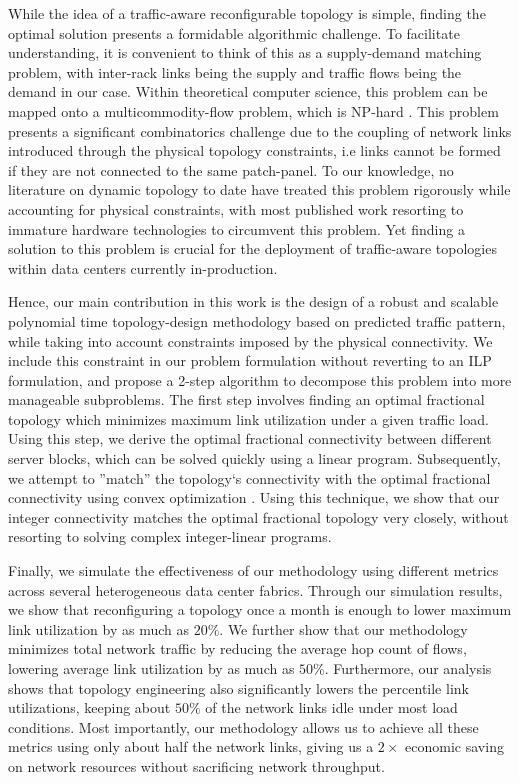 \documentclass[sigconf]{acmart}
\begin{document}
While the idea of a traffic-aware reconfigurable topology is simple, finding the optimal solution presents a formidable algorithmic challenge. To facilitate understanding, it is convenient to think of this as a supply-demand matching problem, with inter-rack links being the supply and traffic flows being the demand in our case. Within theoretical computer science, this problem can be mapped onto a multicommodity-flow problem, which is NP-hard \cite{irving1994three, foerster2018characterizing}. This problem presents a significant combinatorics challenge due to the coupling of network links introduced through the physical topology constraints, i.e links cannot be formed if they are not connected to the same patch-panel. To our knowledge, no literature on dynamic topology to date have treated this problem rigorously while accounting for physical constraints, with most published work resorting to immature hardware technologies \cite{hamedazimi2014firefly, ghobadi2016projector} to circumvent this problem. Yet finding a solution to this problem is crucial for the deployment of traffic-aware topologies within data centers currently in-production.

Hence, our main contribution in this work is the design of a robust and scalable polynomial time topology-design methodology based on predicted traffic pattern, while taking into account constraints imposed by the physical connectivity. We include this constraint in our problem formulation without reverting to an ILP formulation, and propose a 2-step algorithm to decompose this problem into more manageable subproblems. The first step involves finding an optimal fractional topology which minimizes maximum link utilization under a given traffic load. Using this step, we derive the optimal fractional connectivity between different server blocks, which can be solved quickly using a linear program. Subsequently, we attempt to ''match'' the topology`s connectivity with the optimal fractional connectivity using convex optimization \cite{low1999optimization}. Using this technique, we show that our integer connectivity matches the optimal fractional topology very closely, without resorting to solving complex integer-linear programs.

Finally, we simulate the effectiveness of our methodology using different metrics across several heterogeneous data center fabrics. Through our simulation results, we show that reconfiguring a topology once a month is enough to lower maximum link utilization by as much as $20\%$. We further show that our methodology minimizes total network traffic by reducing the average hop count of flows, lowering average link utilization by as much as $50\%$. Furthermore, our analysis shows that topology engineering also significantly lowers the percentile link utilizations, keeping about $50\%$ of the network links idle under most load conditions. Most importantly, our methodology allows us to achieve all these metrics using only about half the network links, giving us a $2\times$ economic saving on network resources without sacrificing network throughput. 
\end{document}
